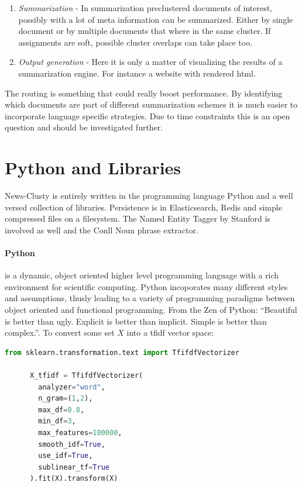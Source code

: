 \begin{enumerate}
    \item \emph{Summarization} - In summarization preclustered documents of interest, possibly with a lot of meta information can be summarized. Either by single document or by multiple documents that where in the same cluster. If assignments are soft, possible cluster overlaps can take place too. 

    \item \emph{Output generation} - Here it is only a matter of visualizing the results of a summarization engine. For instance a website with rendered html.
  \end{enumerate}

  The routing is something that could really boost performance. By identifying which documents are part of different summarization schemes it is much easier to incorporate language specific strategies. Due to time constraints this is an open question and should be investigated further.

\section{Python and Libraries}
  News-Clusty is entirely written in the programming language Python and a well versed collection of libraries. Persistence is in Elasticsearch, Redis and simple compressed files on a filesystem. The Named Entity Tagger by Stanford is involved as well and the Conll Noun phrase extractor. 

  \paragraph{Python} is a dynamic, object oriented higher level programming language with a rich environment for scientific computing. Python incoporates many different styles and assumptions, thusly leading to a variety of programming paradigms between object oriented and functional programming. From the Zen of Python: ``Beautiful is better than ugly. Explicit is better than implicit. Simple is better than complex.''. To convert some set $X$ into a tfidf vector space:

    \begin{lstlisting}[language=Python]
      from sklearn.transformation.text import TfifdfVectorizer

      X_tfidf = TfifdfVectorizer(
        analyzer="word",
        n_gram=(1,2),
        max_df=0.8,
        min_df=3,
        max_features=100000,
        smooth_idf=True,
        use_idf=True,
        sublinear_tf=True
      ).fit(X).transform(X)
    \end{lstlisting}

